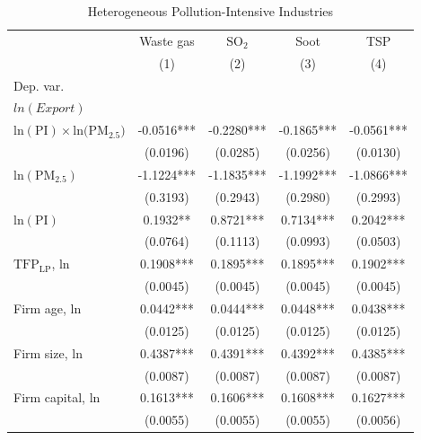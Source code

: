 \documentclass[12pt]{article}
\begin{document}
  
    \begin{table}[H]\centering
      \footnotesize
      \caption{Heterogeneous Pollution-Intensive Industries}\label{tab:hetero_PI}
      \begin{tabular}{l*{4}{c}}
        \hline\hline
        &\multicolumn{1}{c}{Waste gas}&\multicolumn{1}{c}{$\mathrm{SO_{2}}$}&\multicolumn{1}{c}{Soot}&\multicolumn{1}{c}{TSP}\\
        &\multicolumn{1}{c}{(1)}&\multicolumn{1}{c}{(2)}&\multicolumn{1}{c}{(3)}&\multicolumn{1}{c}{(4)}\\
        Dep. var. &&&&\\
        $ln(Export)$ &&&&\\
        \hline
        $\mathrm{ln(PI) \times ln(PM_{2.5}})$ &-0.0516*** &-0.2280***  &-0.1865*** &-0.0561***\\
                                              &(0.0196)   &(0.0285)    &(0.0256)   &(0.0130)\\
        $\mathrm{ln(PM_{2.5})}$               &-1.1224*** &-1.1835***  &-1.1992*** &-1.0866***\\
                                              &(0.3193)   &(0.2943)    &(0.2980)   &(0.2993)\\  
        $\mathrm{ln(PI)}$                     &0.1932**   &0.8721***   &0.7134***  &0.2042***\\ 
                                              &(0.0764)   &(0.1113)    &(0.0993)   &(0.0503)\\   
        $\mathrm{TFP_{LP}}$, ln               &0.1908***  &0.1895***   &0.1895***  &0.1902***\\
                                              &(0.0045)   &(0.0045)    &(0.0045)   &(0.0045)\\
        Firm age, ln                          &0.0442***  &0.0444***   &0.0448***  &0.0438***\\
                                              &(0.0125)   &(0.0125)    &(0.0125)   &(0.0125)\\        
        Firm size, ln                         &0.4387***  &0.4391***   &0.4392***  &0.4385***\\
                                              &(0.0087)   &(0.0087)    &(0.0087)   &(0.0087)\\
        Firm capital, ln                      &0.1613***  &0.1606***   &0.1608***  &0.1627***\\
                                              &(0.0055)   &(0.0055)    &(0.0055)   &(0.0056)\\

\end{tabular}
\end{table}
\end{document}
